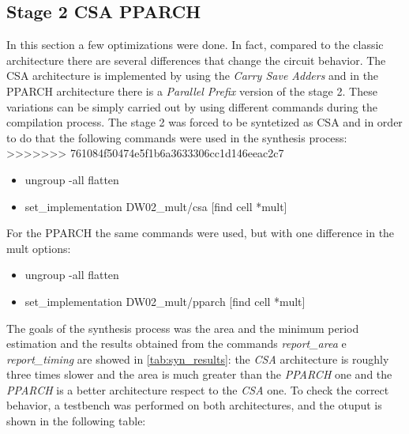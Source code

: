 \subsection{Stage 2 CSA PPARCH}
In this section a few optimizations were done. In fact, compared to the classic architecture there are several differences that change the circuit behavior. The CSA architecture is implemented by using the \textit{Carry Save Adders} and in the PPARCH architecture there is a \textit{Parallel Prefix} version of the stage 2. These variations can be simply carried out by using different commands during the compilation process. The stage 2 was forced to be syntetized as CSA and in order to do that the following commands were used in the synthesis process:
>>>>>>> 761084f50474e5f1b6a3633306cc1d146eeac2c7
\begin{itemize}
\item ungroup -all flatten
\item set\_implementation DW02\_mult/csa [find cell *mult]
\end{itemize}
For the PPARCH the same commands were used, but with one difference in the mult options:
\begin{itemize}
\item ungroup -all flatten
\item set\_implementation DW02\_mult/pparch [find cell *mult]
\end{itemize}
The goals of the synthesis process was the area and the minimum period estimation and the results obtained from the commands \textit{report\_area} e \textit{report\_timing} are showed in \autoref{tab:syn_results}: the \textit{CSA} architecture is roughly three times slower and the area is much greater than the \textit{PPARCH} one and the \textit{PPARCH} is a better architecture respect to the \textit{CSA} one.
To check the correct behavior, a testbench was performed on both architectures, and the otuput is shown in the following table:

